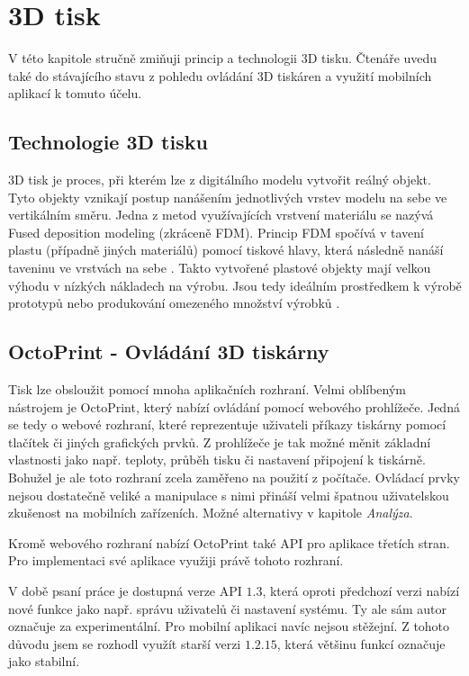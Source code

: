 \chapter{3D tisk}\label{3d-tisk}

V této kapitole stručně zmiňuji princip a technologii 3D tisku.
Čtenáře uvedu také do stávajícího stavu z pohledu ovládání 3D tiskáren a využití mobilních aplikací k tomuto účelu.

\section{Technologie 3D tisku}\label{3d-tisk-technologie}

3D tisk je proces, při kterém lze z digitálního modelu vytvořit reálný objekt.
Tyto objekty vznikají postup nanášením jednotlivých vrstev modelu na sebe ve vertikálním směru.
Jedna z metod využívajících vrstvení materiálu se nazývá Fused deposition modeling (zkráceně FDM).
Princip FDM spočívá v tavení plastu (případně jiných materiálů) pomocí tiskové hlavy, která následně nanáší taveninu ve vrstvách na sebe \cite{3d-print-fdm}.
Takto vytvořené plastové objekty mají velkou výhodu v nízkých nákladech na výrobu.
Jsou tedy ideálním prostředkem k výrobě prototypů nebo produkování omezeného množství výrobků \cite{3d-print-for-prototyping}.

\section{OctoPrint - Ovládání 3D tiskárny}\label{3d-tisk-ovladani}

Tisk lze obsloužit pomocí mnoha aplikačních rozhraní.
Velmi oblíbeným nástrojem je OctoPrint, který nabízí ovládání pomocí webového prohlížeče.
Jedná se tedy o webové rozhraní, které reprezentuje uživateli příkazy tiskárny pomocí tlačítek či jiných grafických prvků.
Z prohlížeče je tak možné měnit základní vlastnosti jako např. teploty, průběh tisku či nastavení připojení k tiskárně.
Bohužel je ale toto rozhraní zcela zaměřeno na použití z počítače.
Ovládací prvky nejsou dostatečně veliké a manipulace s nimi přináší velmi špatnou uživatelskou zkušenost na mobilních zařízeních.
Možné alternativy v kapitole \textit{Analýza}.

Kromě webového rozhraní nabízí OctoPrint také API pro aplikace třetích stran.
Pro implementaci své aplikace využiji právě tohoto rozhraní.

V době psaní práce je dostupná verze API $1.3$, která oproti předchozí verzi nabízí nové funkce jako např. správu uživatelů či nastavení systému.
Ty ale sám autor označuje za experimentální.
Pro mobilní aplikaci navíc nejsou stěžejní.
Z tohoto důvodu jsem se rozhodl využít starší verzi $1.2.15$, která většinu funkcí označuje jako stabilní.

